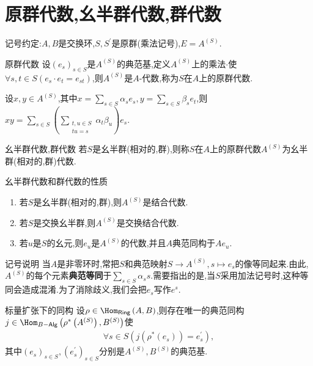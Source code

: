 \section{原群代数,幺半群代数,群代数}

记号约定:$A,B$是交换环,$S,S^{\prime}$是原群(乘法记号),$E=A^{\left(S\right)}$.

\begin{definition}{原群代数}{}
	设$\left(e_{s}\right)_{s\in S}$是$A^{\left(S\right)}$的典范基,定义$A^{\left(S\right)}$上的乘法$\cdot$使$\forall s,t\in S\left(e_{s}\cdot e_{t}=e_{st}\right)$,则$A^{\left(S\right)}$是$A$-代数,称为$S$在$A$上的原群代数.
\end{definition}

\begin{remark}{}{}
	设$x,y\in A^{\left(S\right)}$,其中$x=\sum\limits_{s\in S}\alpha_{s}e_{s},y=\sum\limits_{s\in S}\beta_{s}e_{t}$,则$xy=\sum\limits_{s\in S}\left(\sum\limits_{\substack{t,u\in S\\tu=s}}\alpha_{t}\beta_{u}\right)e_{s}$.
\end{remark}

\begin{definition}{幺半群代数,群代数}{}
	若$S$是幺半群(相对的,群),则称$S$在$A$上的原群代数$A^{\left(S\right)}$为幺半群(相对的,群)代数.
\end{definition}

\begin{proposition}{幺半群代数和群代数的性质}{}
	\begin{enumerate}
		\item 若$S$是幺半群(相对的,群),则$A^{\left(S\right)}$是结合代数.
		\item 若$S$是交换幺半群,则$A^{\left(S\right)}$是交换结合代数.
		\item 若$u$是$S$的幺元,则$e_{u}$是$A^{\left(S\right)}$的代数,并且$A$典范同构于$Ae_{u}$.
	\end{enumerate}
\end{proposition}

\begin{remark}{记号说明}{}
	当$A$是非零环时,常把$S$和典范映射$S\to A^{\left(S\right)},s\mapsto e_{s}$的像等同起来.由此,$A^{\left(S\right)}$的每个元素\textbf{典范等同}于$\sum\limits_{s\in S}\alpha_{s}s$.需要指出的是,当$S$采用加法记号时,这种等同会造成混淆.为了消除歧义,我们会把$e_{s}$写作$e^{s}$.
\end{remark}

\begin{proposition}{标量扩张下的同构}{}
	设$\rho\in\Hom_{\mathsf{Ring}}\left(A,B\right)$,则存在唯一的典范同构$j\in\Hom_{B-\mathsf{Alg}}\left(\rho^{\ast}\left(A^{\left(S\right)}\right),B^{\left(S\right)}\right)$使
	\begin{align*}
		\forall s\in S\left(j\left(\rho^{\ast}\left(e_{s}\right)\right)=e_{s}^{\prime}\right),
	\end{align*}
	其中$\left(e_{s}\right)_{s\in S},\left(e_{s}^{\prime}\right)_{s\in S}$分别是$A^{\left(S\right)},B^{\left(S\right)}$的典范基.
\end{proposition}

